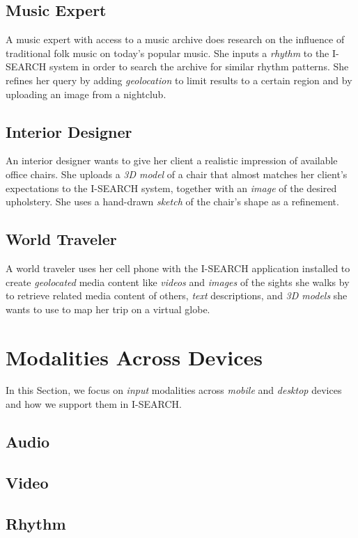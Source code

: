 \documentclass{acm_proc_article-sp}
\let\oldemph\emph
\renewcommand{\emph}[1]{\oldemph{\fontsize{9}{9}\selectfont #1}}
\begin{document}
\subsection{Music Expert}
A music expert with access to a music archive does research on the influence of traditional folk music on today's popular music.
She inputs a \emph{rhythm} to the \mbox{I-SEARCH} system in order to search the archive for similar rhythm patterns.
She refines her query by adding \emph{geolocation} to limit results to a certain region and by uploading an image from a nightclub.

\subsection{Interior Designer}
An interior designer wants to give her client a realistic impression of available office chairs.
She uploads a \emph{3D model} of a chair that almost matches her client's expectations to the \mbox{I-SEARCH} system, together with an \emph{image} of the desired upholstery.
She uses a hand-drawn \emph{sketch} of the chair's shape as a refinement.

\subsection{World Traveler}
A world traveler uses her cell phone with the \mbox{I-SEARCH} application installed to create \emph{geolocated} media content like \emph{videos} and \emph{images} of the sights she walks by to retrieve related media content of others, \emph{text} descriptions, and \emph{3D models} she wants to use to map her trip on a virtual globe.

\section{Modalities Across Devices}
In this Section, we focus on \emph{input} modalities across \emph{mobile} and \emph{desktop} devices and how we support them in \mbox{I-SEARCH}.

\subsection{Audio}
\subsection{Video}
\subsection{Rhythm}
\end{document}
